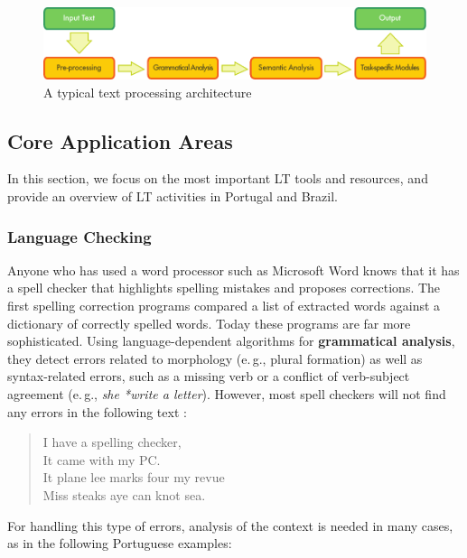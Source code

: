 \documentclass[]{../metanetpaper}
\begin{document}
\begin{multicols}{2}
\begin{figure}[htb]
  \center
  \includegraphics[width=\textwidth]{../_media/english/text_processing_app_architecture}
  \caption{A typical text processing architecture}
  \label{fig:textprocessingarch_en}
\end{figure}

\subsection{Core Application Areas}

In this section, we focus on the most important LT tools and resources, and provide an overview of LT activities in Portugal and Brazil. 

\subsubsection{Language Checking}

Anyone who has used a word processor such as Microsoft Word knows that it has a spell checker that highlights spelling mistakes and proposes corrections. The first spelling correction programs compared a list of extracted words against a dictionary of correctly spelled words. Today these programs are far more sophisticated. Using language-dependent algorithms for \textbf{grammatical analysis}, they detect errors related to morphology (e.\,g., plural formation) as well as syntax-related errors, such as a missing verb or a conflict of verb-subject agreement (e.\,g., \textit{she *write a letter}). However, most spell checkers will not find any errors in the following text \cite{zar1}:

\begin{quote}
  I have a spelling checker,\\
  It came with my PC.\\
  It plane lee marks four my revue\\
  Miss steaks aye can knot sea.
\end{quote}

 For handling this type of errors, analysis of the context is needed in many cases, as in the following Portuguese examples:\\


\end{multicols}
\end{document}
